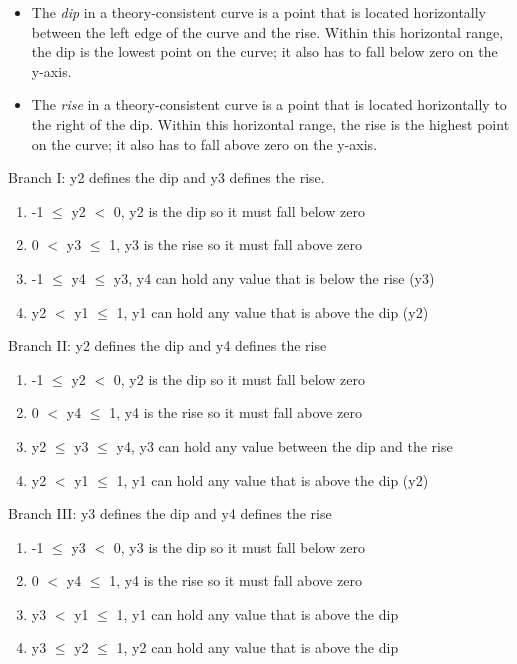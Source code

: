 \begin{itemize}

\item The {\em dip} in a theory-consistent curve is a point that is
  located horizontally between the left edge of the curve and the
  rise. Within this horizontal range, the dip is the lowest point on
  the curve; it also has to fall below zero on the y-axis.

\item The {\em rise} in a theory-consistent curve is a point that is
  located horizontally to the right of the dip. Within this horizontal
  range, the rise is the highest point on the curve; it also has to
  fall above zero on the y-axis.

\end{itemize}


Branch I: y2 defines the dip and y3 defines the rise.
\begin{enumerate}
\item -1 $\leq$ y2 $<$ 0, y2 is the dip so it must fall below zero
\item 0 $<$ y3 $\leq$ 1, y3 is the rise so it must fall above zero
\item -1 $\leq$ y4 $\leq$ y3, y4 can hold any value that is below the
  rise (y3)
\item y2 $<$ y1 $\leq$ 1, y1 can hold any value that is above the dip
  (y2)
\end{enumerate}


Branch II: y2 defines the dip and y4 defines the rise
\begin{enumerate}
\item -1 $\leq$ y2 $<$ 0, y2 is the dip so it must fall below zero
\item 0 $<$ y4 $\leq$ 1, y4 is the rise so it must fall above zero
\item y2 $\leq$ y3 $\leq$ y4, y3 can hold any value between the dip
  and the rise
\item y2 $<$ y1 $\leq$ 1, y1 can hold any value that is above the dip (y2)
\end{enumerate}

Branch III: y3 defines the dip and y4 defines the rise
\begin{enumerate}
\item -1 $\leq$ y3 $<$ 0, y3 is the dip so it must fall below zero
\item 0 $<$ y4 $\leq$ 1, y4 is the rise so it must fall above zero
\item y3 $<$ y1 $\leq$ 1, y1 can hold any value that is above the dip
\item y3 $\leq$ y2 $\leq$ 1, y2 can hold any value that is above the
  dip
\end{enumerate}
